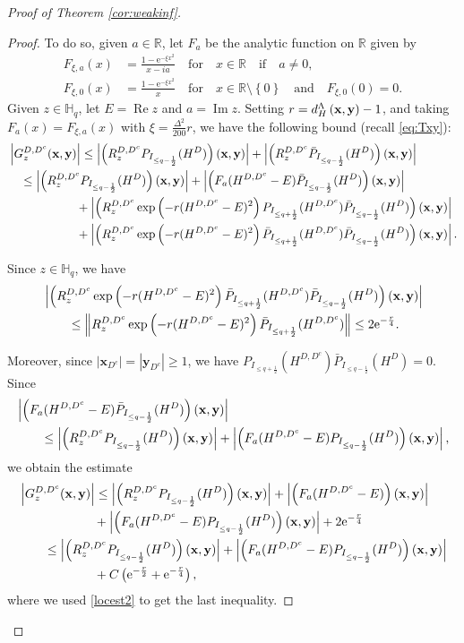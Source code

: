 \documentclass[12pt, a4paper,reqno]{amsart}
\numberwithin{equation}{section}
\DeclareMathOperator{\Rea}{Re}
\DeclareMathOperator{\Ima}{Im}
\newcommand\R{\mathbb R}
\newcommand\x{\mathbf{x}}
\newcommand\y{\mathbf{y}}
\newcommand\e{\mathrm{e}}
\newcommand\be{\begin{equation}\begin{aligned}}
\newcommand\ee{\end{aligned}\end{equation}}
\newcommand{\abs}[1]{\left\lvert #1 \right\rvert}
\newcommand{\norm}[1]{\left\lVert #1 \right\rVert}
\newcommand{\set}[1]{\left\{ #1 \right\}}
\newcommand{\pa}[1]{\left( #1 \right)}
\newcommand\La{\Lambda}
\newcommand{\qtx}[1]{\quad\text{#1}\quad}
\begin{document}
\begin{proof}[Proof of  Theorem \ref{cor:weakinf}]
\begin{proof}
To do so, given  $a\in\R$,  let $F_{a}$ be the  analytic  function on $\R$ given by
  \be\label{defF}
   F_{\xi,a} (x)&= \frac{1-\e^{-\xi x^2}}{x-ia} \qtx{for} x \in \R \qtx{if} a\ne 0,\\
    F_{\xi,0} (x)&= \frac{1-\e^{-\xi x^2}}{x} \qtx{for} x \in  \R\setminus \set{0} \qtx{and} F_{\xi,0} (0)=0.
   \ee 
Given $z\in\mathds{H}_q$, let $E=\Rea z$ and $a=\Ima z$.   Setting $r= d_H^\La \pa{{\bf x},{\bf y}}-1$, and taking $F_a (x)=  F_{\xi,a} (x)$ with  $ \xi= \frac {\Delta^2}{200}  r$, we have the following bound (recall \eqref{eq:Txy}):  
\be\label{eq:decen}
& \abs{G^{D,D^c}_{z}({\bf x},{\bf y})}\le \abs{\pa{R^{D,D^c}_{z}P_{I_{\le q-\frac12}}(H^{D})}({\bf x},{\bf y})}+\abs{\pa{R^{D,D^c}_{z}\bar P_{I_{\le q-\frac12}}(H^{D})}({\bf x},{\bf y})}\\
&  \quad \le \abs{\pa{R^{D,D^c}_{z}P_{I_{\le q-\frac12}}(H^{D})}({\bf x},{\bf y})}+   \abs{\pa{F_{a}(H^{D,D^c}-E)\bar P_{I_{\le q-\frac12}}(H^{D})}({\bf x},{\bf y})}\\ &\hspace{2cm}  + \abs{\pa{R_z^{D,D^c}\exp\pa{-r(H^{D,D^c}-E)^2}P_{I_{\le q+\frac12}}(H^{D,D^c})\bar P_{I_{\le q-\frac12}}(H^{D})}({\bf x},{\bf y})}\\ &\hspace{2cm} + \abs{\pa{R_z^{D,D^c}\exp\pa{-r(H^{D,D^c}-E)^2}\bar P_{I_{\le q+\frac12}}(H^{D,D^c})\bar P_{I_{\le q-\frac12}}(H^{D})}({\bf x},{\bf y})}.
\ee

 Since  $z\in\mathds{H}_q$, we have 
\be
&\abs{\pa{R_z^{D,D^c}\exp\pa{-r(H^{D,D^c}-E)^2}\bar P_{I_{\le q+\frac12}}(H^{D,D^c})\bar P_{I_{\le q-\frac12}}(H^{D})}({\bf x},{\bf y})}\\
& \qquad 
\le \norm{{R_z^{D,D^c}\exp\pa{-r(H^{D,D^c}-E)^2}\bar P_{I_{\le q+\frac12}}(H^{D,D^c})}}
\le 2 \e^{-\frac r 4 }.
\ee

Moreover,
since  $ \abs{\x_{D^c}}= \abs{\y _{D^c}}\ge 1 $, we have $P_{I_{\le q+\frac12}}(H^{D,D^c})\bar P_{I_{\le q-\frac12}}(H^{D})=0$. Since 
\be
& \abs{\pa{F_{a}(H^{D,D^c}-E)\bar P_{I_{\le q-\frac12}}(H^{D})}({\bf x},{\bf y})}\\
& \qquad \le \abs{\pa{R^{D,D^c}_{z}P_{I_{\le q-\frac12}}(H^{D})}({\bf x},{\bf y})} +  \abs{\pa{F_{a}(H^{D,D^c}-E) P_{I_{\le q-\frac12}}(H^{D})}({\bf x},{\bf y})}, 
\ee 
we obtain the estimate
\be\label{eq:decena}
&\abs{G^{D,D^c}_{z}({\bf x},{\bf y})}\le \abs{\pa{R^{D,D^c}_{z}P_{I_{\le q-\frac12}}(H^{D})}({\bf x},{\bf y})} +     \abs{\pa{F_{a}(H^{D,D^c}-E)}({\bf x},{\bf y})}\\ &\hskip60pt 
+ \abs{\pa{F_{a}(H^{D,D^c}-E) P_{I_{\le q-\frac12}}(H^{D})}({\bf x},{\bf y})}+  2 \e^{-\frac r 4 }\\
&\hskip20pt \le \abs{\pa{R^{D,D^c}_{z}P_{I_{\le q-\frac12}}(H^{D})}({\bf x},{\bf y})} +  \abs{\pa{F_{a}(H^{D,D^c}-E) P_{I_{\le q-\frac12}}(H^{D})}({\bf x},{\bf y})}   \\&\hskip60pt  +C\pa{\e^{-\frac r 2} +\e^{-\frac r 4 }},
\ee
 where we used  \eqref{locest2} to get the last inequality.
 



\end{proof}
\end{proof}
\end{document}

